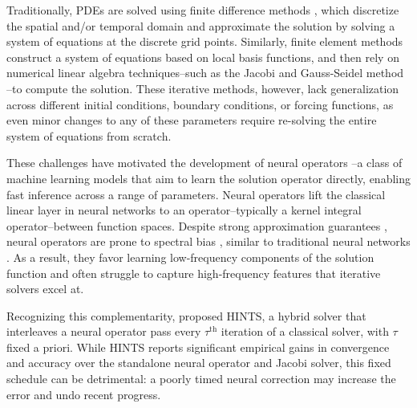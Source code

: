 \documentclass{article}
\newcommand{\ambuj}[1]{\textcolor{red}{AT: #1}}
\begin{document}
Traditionally, PDEs are solved using finite difference methods \citep{smith1985numerical,leveque2007finite}, which discretize the spatial and/or temporal domain and approximate the solution by solving a system of equations at the discrete grid points. Similarly, finite element methods \citep{hughes2003finite,bathe2006finite,brenner2008mathematical} construct a system of equations based on local basis functions, and then rely on numerical linear algebra techniques--such as the Jacobi and Gauss-Seidel method \citep{saad2003iterative}--to compute the solution. These iterative methods, however, lack generalization across different initial conditions, boundary conditions, or forcing functions, as even minor changes to any of these parameters require re-solving the entire system of equations from scratch. 

These challenges have motivated the development of neural operators \citep{kovachki2023neural}--a class of machine learning models that aim to learn the solution operator directly, enabling fast inference across a range of parameters. Neural operators lift the classical linear layer in neural networks to an operator--typically a kernel integral operator--between function spaces. Despite strong approximation guarantees \citep{chen1995universal}, neural operators are prone to spectral bias \citep{liu2021multiscale,liu2024mitigating,you2024mscalefno,khodakarami2025mitigating,xu2025understanding}, similar to traditional neural networks \citep{rahaman2019spectral,xu2019frequency,luo2019theory}. As a result, they favor learning low-frequency components of the solution function and often struggle to capture high-frequency features that iterative solvers excel at. 

Recognizing this complementarity, \citet{zhang2024blending} proposed HINTS, a hybrid solver that 
interleaves a neural operator pass every $\tau^{\text{th}}$ iteration of a classical solver, with $\tau$ fixed a priori.
While HINTS reports significant empirical gains in convergence and accuracy over the standalone neural operator and Jacobi solver, this fixed schedule can be detrimental: a poorly timed neural correction may increase the error and undo recent progress. 
\end{document}
